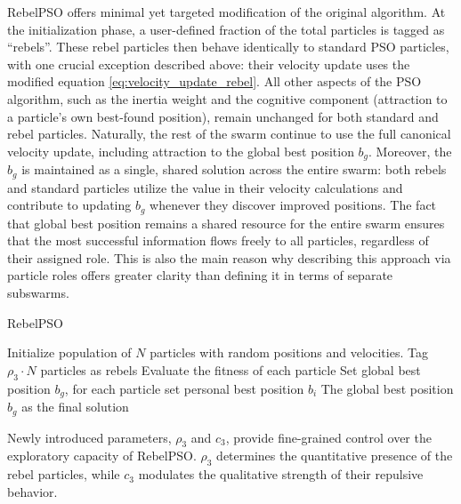 {RebelPSO offers minimal yet targeted modification of the original algorithm.
At the initialization phase, a user-defined fraction of the total particles is tagged as ``rebels''. These rebel particles then behave identically to standard PSO particles, with one crucial exception described above:  their velocity update uses the modified equation \eqref{eq:velocity_update_rebel}. All other aspects of the PSO algorithm, such as the inertia weight and the cognitive component (attraction to a particle's own best-found position), remain unchanged for both standard and rebel particles. Naturally, the rest of the swarm continue to use the full canonical velocity update, including attraction to the global best position $b_g$. Moreover, the $b_g$ is maintained as a single, shared solution across the entire swarm: both rebels and standard particles utilize the value in their velocity calculations and contribute to updating $b_g$ whenever they discover improved positions. The fact that global best position  remains a shared resource for the entire swarm ensures that the most successful information flows freely to all particles, regardless of their assigned role.
This is also the main reason why describing this approach via particle roles offers greater clarity than defining it in terms of separate subswarms.
\vspace{.935em}

\begin{algorithm}[H]
\caption{RebelPSO}\label{alg:rebel}
Initialize population of \(N\) particles with random positions and velocities. Tag \(\rho_3 \cdot N\) particles as rebels\;
Evaluate the fitness of each particle\;
Set global best position \(b_g\), for each particle set personal best position \(b_i\)\;
\Return The global best position \(b_g\) as the final solution\;
\end{algorithm}

\vspace{.935em}
Newly introduced parameters, $\rho_3$ and $c_3$, provide fine-grained control over the exploratory capacity of RebelPSO. $\rho_3$ determines the quantitative presence of the rebel particles, while $c_3$ modulates the qualitative strength of their repulsive behavior.

}
